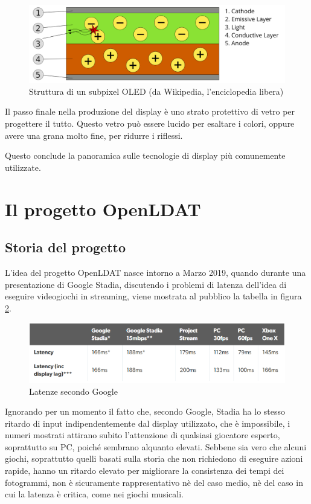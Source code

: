 \begin{figure}[h]
	\centering
	\includegraphics[width=\textwidth]{Introduzione_files/oled.png}
	\caption{Struttura di un subpixel OLED (da Wikipedia, l'enciclopedia libera)}
	\label{fig:oled}
\end{figure}

Il passo finale nella produzione del display è uno strato protettivo di vetro per progettere il tutto. Questo vetro può essere lucido per esaltare i colori, oppure avere una grana molto fine, per ridurre i riflessi.

Questo conclude la panoramica sulle tecnologie di display più comunemente utilizzate.

\section{Il progetto OpenLDAT}
\subsection{Storia del progetto}
L'idea del progetto OpenLDAT nasce intorno a Marzo 2019, quando durante una presentazione di Google Stadia, discutendo i problemi di latenza dell'idea di eseguire videogiochi in streaming, viene mostrata al pubblico la tabella in figura \ref{fig:stadialies}.
\begin{figure}[h]
	\centering
	\includegraphics[width=\textwidth]{Introduzione_files/lies.png}
	\caption{Latenze secondo Google}
	\label{fig:stadialies}
\end{figure}

Ignorando per un momento il fatto che, secondo Google, Stadia ha lo stesso ritardo di input indipendentemente dal display utilizzato, che è impossibile, i numeri mostrati attirano subito l'attenzione di qualsiasi giocatore esperto, soprattutto su PC, poiché sembrano alquanto elevati. Sebbene sia vero che alcuni giochi, soprattutto quelli basati sulla storia che non richiedono di eseguire azioni rapide, hanno un ritardo elevato per migliorare la consistenza dei tempi dei fotogrammi, non è sicuramente rappresentativo nè del caso medio, nè del caso in cui la latenza è critica, come nei giochi musicali.

